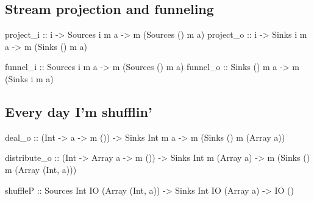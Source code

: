 \eject
\subsection{Stream projection and funneling}

\begin{code}
project_i  :: i ->   Sources i m a -> m (Sources () m a)
project_o  :: i ->   Sinks   i m a -> m (Sinks   () m a)

funnel_i   ::        Sources i m a -> m (Sources () m a)
funnel_o   ::        Sinks  () m a -> m (Sinks   i  m a)
\end{code}


\subsection{Every day I'm shufflin'}


\begin{code}
deal_o       
 :: (Int -> a -> m ()) 
 -> Sinks Int m a
 -> m (Sinks () m (Array a))

distribute_o 
 :: (Int -> Array a -> m ())
 -> Sinks Int m (Array a) 
 -> m (Sinks () m (Array (Int, a)))

shuffleP
 :: Sources Int IO (Array (Int, a))
 -> Sinks   Int IO (Array a)
             -> IO ()
\end{code}

